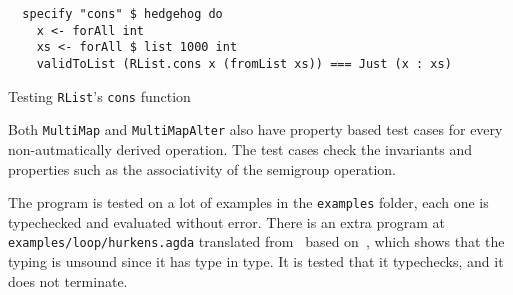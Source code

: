 \begin{listing}
  \begin{verbatim}
  specify "cons" $ hedgehog do
    x <- forAll int
    xs <- forAll $ list 1000 int
    validToList (RList.cons x (fromList xs)) === Just (x : xs)
  \end{verbatim}
  \caption{Testing \texttt{RList}'s \texttt{cons} function
  }\label{lst:rlist-cons}
\end{listing}

Both \texttt{MultiMap} and \texttt{MultiMapAlter} also have
property based test cases for every non-autmatically derived operation. The test
cases check the invariants and properties such as the associativity of the
semigroup operation.

The program is tested on a lot of examples in the \texttt{examples} folder, each
one is typechecked and evaluated without error. There is an extra program at
\texttt{examples/loop/hurkens.agda} translated from~\cite{hurkens-Agda} based
on~\cite{hurkens}, which shows that the typing is unsound since it has type in
type. It is tested that it typechecks, and it does not terminate.
